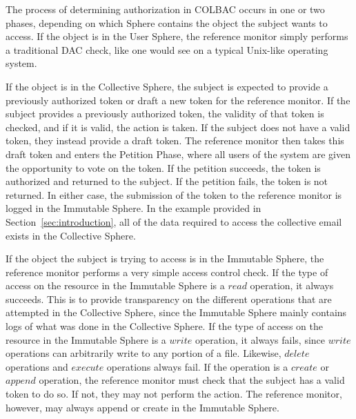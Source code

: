 The process of determining authorization in COLBAC occurs in one or two phases,
depending on which Sphere contains the object the subject wants to access.
If the object is in the User Sphere, the reference monitor simply performs a
traditional DAC check, like one would see on a typical Unix-like operating
system.

If the object is in the Collective Sphere, the subject is expected to
provide a previously authorized token or draft a new token for the reference
monitor. If the subject provides a previously authorized token, the validity of
that token is checked, and if it is valid, the action is taken. If the subject
does not have a valid token, they instead provide a draft token. The reference
monitor then takes this draft token and enters the Petition Phase, where all
users of the system are given the opportunity to vote on the token. If the
petition succeeds, the token is authorized and returned to the subject. If the
petition fails, the token is not returned. In either case, the submission of the
token to the reference monitor is logged in the Immutable Sphere. In the example
provided in Section~\ref{sec:introduction}, all of the data required to access
the collective email exists in the Collective Sphere.

If the object the subject is trying to access is in the Immutable Sphere, the
reference monitor performs a very simple access control check. If the type of
access on the resource in the Immutable Sphere is a $read$ operation, it always
succeeds. This is to provide transparency on the different operations that are
attempted in the Collective Sphere, since the Immutable Sphere mainly contains
logs of what was done in the Collective Sphere. If the type of access on the
resource in the Immutable Sphere is a $write$ operation, it always fails, since
$write$ operations can arbitrarily write to any portion of a file. Likewise,
$delete$ operations and $execute$ operations always fail. If the operation is a
$create$ or $append$ operation, the reference monitor must check that the
subject has a valid token to do so. If not, they may not perform the action.
The reference monitor, however, may always append or create in the Immutable
Sphere.

